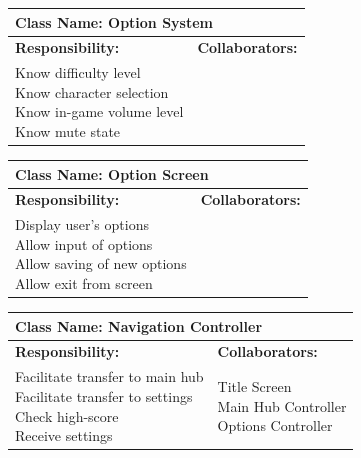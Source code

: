 \documentclass[]{article}
\begin{document}
\begin{table}[H]
	\centering
	\begin{tabular}{|p{5cm}|p{5cm}|}
	\hline 
	\multicolumn{2}{|l|}{\textbf{Class Name: Option System}} \\
	\hline
	\textbf{Responsibility:} & \textbf{Collaborators:} \\
	\hline
	\makecell[l]{
	Know difficulty level\\
	Know character selection\\
	Know in-game volume level\\
	Know mute state
	} & \makecell[c]{
	}\\
	\hline
	\end{tabular}
\end{table}	

\begin{table}[H]
	\centering
	\begin{tabular}{|p{5cm}|p{5cm}|}
	\hline 
	\multicolumn{2}{|l|}{\textbf{Class Name: Option Screen}} \\
	\hline
	\textbf{Responsibility:} & \textbf{Collaborators:} \\
	\hline
	\makecell[l]{
	Display user's options\\
	Allow input of options\\
	Allow saving of new options\\
	Allow exit from screen
	} & \makecell[c]{Options Controller}\\
	\hline
	\end{tabular}
\end{table}	

\begin{table}[H]
	\centering
	\begin{tabular}{|p{5cm}|p{5cm}|}
	\hline 
	\multicolumn{2}{|l|}{\textbf{Class Name: Navigation Controller}} \\
	\hline
	\textbf{Responsibility:} & \textbf{Collaborators:} \\
	\hline
	\makecell[l]{
	Facilitate transfer to main hub\\
	Facilitate transfer to settings \\
	Check high-score\\
	Receive settings\\
	} & \makecell[c]{Title Screen\\Main Hub Controller\\Options Controller}\\
	\hline
	\end{tabular}
\end{table}	
\end{document}
